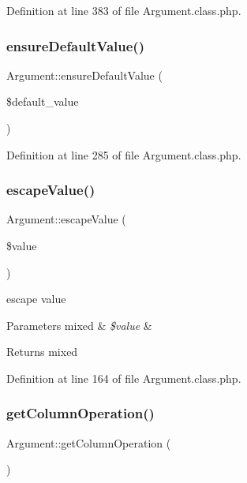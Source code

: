 Definition at line 383 of file Argument.\+class.\+php.

\mbox{\label{classArgument_a4af92bc005f3d9328c63c0722fd3aef7}} 
\subsubsection{\texorpdfstring{ensure\+Default\+Value()}{ensureDefaultValue()}}
{\footnotesize\ttfamily Argument\+::ensure\+Default\+Value (\begin{DoxyParamCaption}\item[{}]{\$default\+\_\+value }\end{DoxyParamCaption})}



Definition at line 285 of file Argument.\+class.\+php.

\mbox{\label{classArgument_a217bae48930e0208210aa7030a2f2b27}} 
\subsubsection{\texorpdfstring{escape\+Value()}{escapeValue()}}
{\footnotesize\ttfamily Argument\+::escape\+Value (\begin{DoxyParamCaption}\item[{}]{\$value }\end{DoxyParamCaption})}

escape value 
\begin{DoxyParams}[1]{Parameters}
mixed & {\em \$value} & \\
\hline
\end{DoxyParams}
\begin{DoxyReturn}{Returns}
mixed 
\end{DoxyReturn}


Definition at line 164 of file Argument.\+class.\+php.

\mbox{\label{classArgument_a8720ec6d3b4cccdb6dfdd072bb77c9d3}} 
\subsubsection{\texorpdfstring{get\+Column\+Operation()}{getColumnOperation()}}
{\footnotesize\ttfamily Argument\+::get\+Column\+Operation (\begin{DoxyParamCaption}{ }\end{DoxyParamCaption})}



